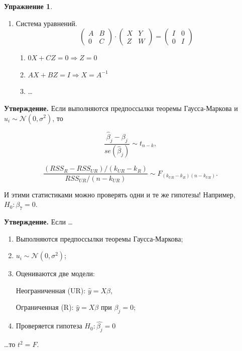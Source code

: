 \documentclass[12pt]{article} %
\theoremstyle{definition} %
\newtheorem{exercise}{Упражнение}[section]
\begin{document}
\begin{exercise}
\begin{enumerate}
\item Система уравнений.
\[
\begin{pmatrix} A & B \\ 0 & C \end{pmatrix} \cdot \begin{pmatrix} X & Y \\ Z & W \end{pmatrix} = \begin{pmatrix} I & 0 \\ 0 & I \end{pmatrix}
\]
\renewcommand{\labelenumii}{\arabic{enumii}.}
\begin{enumerate}
    \item $0X + CZ = 0 \Rightarrow Z = 0$
    \item $AX + BZ = I  \Rightarrow X = A^{-1}$
    \item \dots
\end{enumerate}

\end{enumerate}

\end{exercise}

\textbf{Утверждение.}
Если выполняются предпоссылки теоремы Гаусса-Маркова и $u_i \sim \mathcal{N}(0, \sigma^2)$, то

\[ \frac{\hat{\beta}_j - \beta_j}{se(\hat{\beta}_j)} \sim t_{n-k},
\]

\[\frac{(RSS_{R} - RSS_{UR})/(k_{UR} - k_{R})}{RSS_{UR}/(n - k_{UR})} \sim F_{(k_{UR} - k_{R})(n - k_{UR})}.
\]

И этими статистиками можно проверять одни и те же гипотезы! Например, $H_0: \beta_{7} = 0$.


\textbf{Утверждение.} Если \ldots
\begin{enumerate}
    \item Выполняются предпоссылки теоремы Гаусса-Маркова;
    \item $u_i \sim \mathcal{N}(0, \sigma^2)$;
    \item Оцениваются две модели:

    Неограниченная (UR): $\hat{y} = X\beta$,

    Ограниченная (R): $\hat{y} = X\beta$ при $\beta_j = 0$;
    \item Проверяется гипотеза $H_{0}: \hat{\beta_j} = 0$
\end{enumerate}

\begin{center}
\ldots то  $t^2 = F$.
\end{center}
\end{document}
